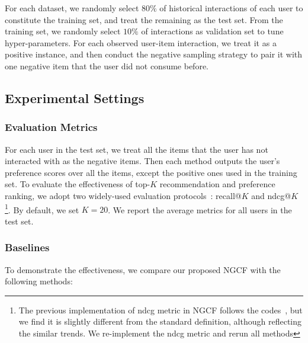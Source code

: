 \documentclass[sigconf]{acmart}
\theoremstyle{definition}
\begin{document}
For each dataset, we randomly select $80\%$ of historical interactions of each user to constitute the training set, and treat the remaining as the test set.
From the training set, we randomly select $10\%$ of interactions as validation set to tune hyper-parameters.
For each observed user-item interaction, we treat it as a positive instance, and then conduct the negative sampling strategy to pair it with one negative item that the user did not consume before.





\subsection{Experimental Settings}
\subsubsection{\textbf{Evaluation Metrics}}
For each user in the test set, we treat all the items that the user has not interacted with as the negative items.
Then each method outputs the user's preference scores over all the items, except the positive ones used in the training set.
To evaluate the effectiveness of top-$K$ recommendation and preference ranking, we adopt two widely-used evaluation protocols~\cite{NCF,HOP-rec}: recall@$K$ and ndcg@$K$\footnote{The previous implementation of ndcg metric in NGCF follows the codes~\cite{IRGAN}, but we find it is slightly different from the standard definition, although reflecting the similar trends. We re-implement the ndcg metric and rerun all methods}.
By default, we set $K=20$.
We report the average metrics for all users in the test set.






\subsubsection{\textbf{Baselines}}
To demonstrate the effectiveness, we compare our proposed NGCF with the following methods:
\end{document}
